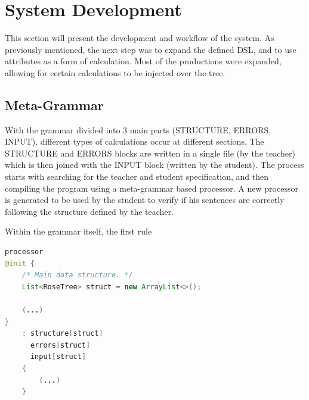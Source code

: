 \chapter{System Development} \label{system_development}

This section will present the development and workflow of the system. 
As previously mentioned, the next step was to expand the defined DSL, and to use attributes as a form of calculation. 
Most of the productions were expanded, allowing for certain calculations to be injected over the tree.


\section{Meta-Grammar}

With the grammar divided into 3 main parts (STRUCTURE, ERRORS, INPUT), different types of calculations occur at different sections. The STRUCTURE and ERRORS blocks are written in a single file (by the teacher) which is then joined 
with the INPUT block (written by the student). The process starts with searching for the teacher and student specification, and then compiling the program using a meta-grammar based processor. A new processor is generated to be 
used by the student to verify if his sentences are correctly following the structure defined by the teacher.

Within the grammar itself, the first rule
\newpage

%

\begin{center}
\begin{minipage}{11cm}
\begin{lstlisting}[language=java, basicstyle=\small, label={lst:processor}, caption=Processor rule from the meta-grammar]
processor
@init {
    /* Main data structure. */
    List<RoseTree> struct = new ArrayList<>();

    (...)
}
    : structure[struct]
      errors[struct]
      input[struct]
    {
        (...)
    }
\end{lstlisting}
\end{minipage}
\end{center}

